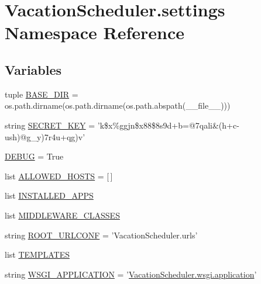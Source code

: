 \hypertarget{namespaceVacationScheduler_1_1settings}{\section{Vacation\-Scheduler.\-settings Namespace Reference}
\label{namespaceVacationScheduler_1_1settings}
}
\subsection*{Variables}
\begin{DoxyCompactItemize}
\item 
tuple \hyperlink{namespaceVacationScheduler_1_1settings_aecdfd4355a884d98dd8879e279d3fa57}{B\-A\-S\-E\-\_\-\-D\-I\-R} = os.\-path.\-dirname(os.\-path.\-dirname(os.\-path.\-abspath(\-\_\-\-\_\-file\-\_\-\-\_\-)))
\item 
string \hyperlink{namespaceVacationScheduler_1_1settings_a21065396eac0aeb9036c394f47d30f29}{S\-E\-C\-R\-E\-T\-\_\-\-K\-E\-Y} = 'k\$x\%ggjn\$x88\$8s9d+b=@7qali\&(h+c-\/ush)@g\-\_\-y)7r4u+qg)v'
\item 
\hyperlink{namespaceVacationScheduler_1_1settings_aac5b371fe5ecede3f3f68e05a2aabc18}{D\-E\-B\-U\-G} = True
\item 
list \hyperlink{namespaceVacationScheduler_1_1settings_ad2eb9be385a19e65d0c1095578626e3f}{A\-L\-L\-O\-W\-E\-D\-\_\-\-H\-O\-S\-T\-S} = \mbox{[}$\,$\mbox{]}
\item 
list \hyperlink{namespaceVacationScheduler_1_1settings_a0813658850d65a1cd79b3c90020160be}{I\-N\-S\-T\-A\-L\-L\-E\-D\-\_\-\-A\-P\-P\-S}
\item 
list \hyperlink{namespaceVacationScheduler_1_1settings_a3aaf53b9da3dadabeb977ad8e40805d3}{M\-I\-D\-D\-L\-E\-W\-A\-R\-E\-\_\-\-C\-L\-A\-S\-S\-E\-S}
\item 
string \hyperlink{namespaceVacationScheduler_1_1settings_ab403feea447f53a8dd99f5ec7d1d6147}{R\-O\-O\-T\-\_\-\-U\-R\-L\-C\-O\-N\-F} = 'Vacation\-Scheduler.\-urls'
\item 
list \hyperlink{namespaceVacationScheduler_1_1settings_a94a6de58cd85b4097a8e8aaa23e46015}{T\-E\-M\-P\-L\-A\-T\-E\-S}
\item 
string \hyperlink{namespaceVacationScheduler_1_1settings_ac8d4cd49d0a6b3d6dd2e7f8fa11e7cf1}{W\-S\-G\-I\-\_\-\-A\-P\-P\-L\-I\-C\-A\-T\-I\-O\-N} = '\hyperlink{namespaceVacationScheduler_1_1wsgi_ae72c171b7add0dd119c41bf17421710c}{Vacation\-Scheduler.\-wsgi.\-application}'
\item 

\end{DoxyCompactItemize}
